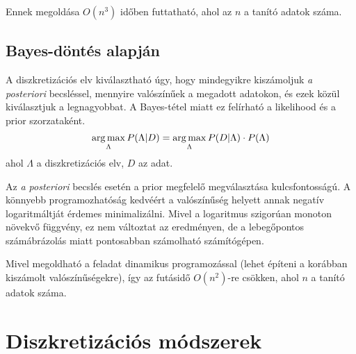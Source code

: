 
Ennek megoldása $O(n^3)$ időben futtatható, ahol az $n$ a tanító adatok száma.

\subsection{Bayes-döntés alapján}
A diszkretizációs elv kiválasztható úgy, hogy mindegyikre kiszámoljuk \textit{a posteriori} becsléssel, mennyire valószínűek a megadott adatokon, és ezek közül kiválasztjuk a legnagyobbat. A Bayes-tétel miatt ez felírható a likelihood és a prior szorzataként.
$$ \operatorname*{arg\,max}_{\Lambda}{P(\Lambda | D)} =
\operatorname*{arg\,max}_{\Lambda}{P(D | \Lambda) \cdot P(\Lambda)} $$
ahol $\Lambda$ a diszkretizációs elv, $D$ az adat.

Az \textit{a posteriori} becslés esetén a prior megfelelő megválasztása kulcsfontosságú. A könnyebb programozhatóság kedvéért a valószínűség helyett annak negatív logaritmáltját érdemes minimalizálni. Mivel a logaritmus szigorúan monoton növekvő függvény, ez nem változtat az eredményen, de a lebegőpontos számábrázolás miatt pontosabban számolható számítógépen.

Mivel megoldható a feladat dinamikus programozással (lehet építeni a korábban kiszámolt valószínűségekre), így az futásidő $O(n^2)$-re csökken, ahol $n$ a tanító adatok száma.

\section{Diszkretizációs módszerek}

